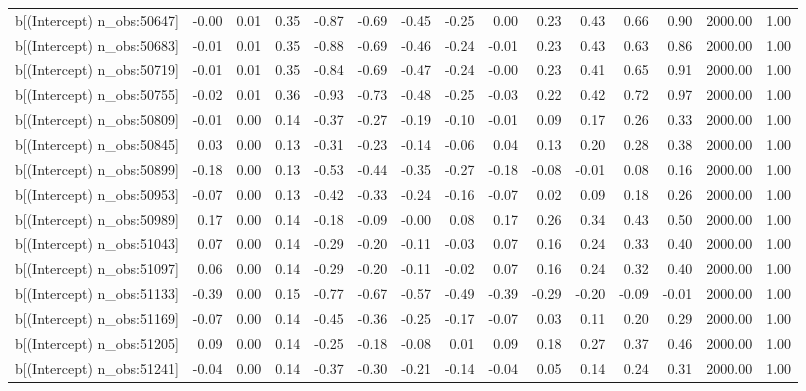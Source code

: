 \begin{table}[ht]
\begin{tabular}{rrrrrrrrrrrrrrr}
  b[(Intercept) n\_obs:50647] & -0.00 & 0.01 & 0.35 & -0.87 & -0.69 & -0.45 & -0.25 & 0.00 & 0.23 & 0.43 & 0.66 & 0.90 & 2000.00 & 1.00 \\ 
  b[(Intercept) n\_obs:50683] & -0.01 & 0.01 & 0.35 & -0.88 & -0.69 & -0.46 & -0.24 & -0.01 & 0.23 & 0.43 & 0.63 & 0.86 & 2000.00 & 1.00 \\ 
  b[(Intercept) n\_obs:50719] & -0.01 & 0.01 & 0.35 & -0.84 & -0.69 & -0.47 & -0.24 & -0.00 & 0.23 & 0.41 & 0.65 & 0.91 & 2000.00 & 1.00 \\ 
  b[(Intercept) n\_obs:50755] & -0.02 & 0.01 & 0.36 & -0.93 & -0.73 & -0.48 & -0.25 & -0.03 & 0.22 & 0.42 & 0.72 & 0.97 & 2000.00 & 1.00 \\ 
  b[(Intercept) n\_obs:50809] & -0.01 & 0.00 & 0.14 & -0.37 & -0.27 & -0.19 & -0.10 & -0.01 & 0.09 & 0.17 & 0.26 & 0.33 & 2000.00 & 1.00 \\ 
  b[(Intercept) n\_obs:50845] & 0.03 & 0.00 & 0.13 & -0.31 & -0.23 & -0.14 & -0.06 & 0.04 & 0.13 & 0.20 & 0.28 & 0.38 & 2000.00 & 1.00 \\ 
  b[(Intercept) n\_obs:50899] & -0.18 & 0.00 & 0.13 & -0.53 & -0.44 & -0.35 & -0.27 & -0.18 & -0.08 & -0.01 & 0.08 & 0.16 & 2000.00 & 1.00 \\ 
  b[(Intercept) n\_obs:50953] & -0.07 & 0.00 & 0.13 & -0.42 & -0.33 & -0.24 & -0.16 & -0.07 & 0.02 & 0.09 & 0.18 & 0.26 & 2000.00 & 1.00 \\ 
  b[(Intercept) n\_obs:50989] & 0.17 & 0.00 & 0.14 & -0.18 & -0.09 & -0.00 & 0.08 & 0.17 & 0.26 & 0.34 & 0.43 & 0.50 & 2000.00 & 1.00 \\ 
  b[(Intercept) n\_obs:51043] & 0.07 & 0.00 & 0.14 & -0.29 & -0.20 & -0.11 & -0.03 & 0.07 & 0.16 & 0.24 & 0.33 & 0.40 & 2000.00 & 1.00 \\ 
  b[(Intercept) n\_obs:51097] & 0.06 & 0.00 & 0.14 & -0.29 & -0.20 & -0.11 & -0.02 & 0.07 & 0.16 & 0.24 & 0.32 & 0.40 & 2000.00 & 1.00 \\ 
  b[(Intercept) n\_obs:51133] & -0.39 & 0.00 & 0.15 & -0.77 & -0.67 & -0.57 & -0.49 & -0.39 & -0.29 & -0.20 & -0.09 & -0.01 & 2000.00 & 1.00 \\ 
  b[(Intercept) n\_obs:51169] & -0.07 & 0.00 & 0.14 & -0.45 & -0.36 & -0.25 & -0.17 & -0.07 & 0.03 & 0.11 & 0.20 & 0.29 & 2000.00 & 1.00 \\ 
  b[(Intercept) n\_obs:51205] & 0.09 & 0.00 & 0.14 & -0.25 & -0.18 & -0.08 & 0.01 & 0.09 & 0.18 & 0.27 & 0.37 & 0.46 & 2000.00 & 1.00 \\ 
  b[(Intercept) n\_obs:51241] & -0.04 & 0.00 & 0.14 & -0.37 & -0.30 & -0.21 & -0.14 & -0.04 & 0.05 & 0.14 & 0.24 & 0.31 & 2000.00 & 1.00 \\ 

\end{tabular}
\end{table}
